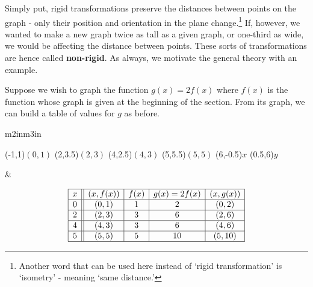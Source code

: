 \smallskip

Simply put, rigid transformations preserve the distances between points on the graph -  only their position and orientation in the plane change.\footnote{Another word that can be used here instead of `rigid transformation' is `isometry' - meaning `same distance.'}  If, however, we wanted to make a new graph twice as tall as a given graph, or one-third as wide, we would be affecting the distance between points. These sorts of transformations are hence called \textbf{non-rigid}.  As always, we motivate the general theory with an example.

\smallskip

Suppose we wish to graph the function $g(x) =2 f(x)$ where $f(x)$ is the function whose graph is given at the beginning of the section. From its graph, we can build a table of values for $g$ as before.

\begin{center}

\begin{tabular}{m{2in}m{3in}}

\begin{mfpic}[15]{-1}{6}{-1}{6}
\tlabel[cc](-1,1){\scriptsize $(0,1)$}
\tlabel[cc](2,3.5){\scriptsize $(2,3)$}
\tlabel[cc](4,2.5){\scriptsize $(4,3)$}
\tlabel[cc](5,5.5){\scriptsize $(5,5)$}
\tlabel[cc](6,-0.5){\scriptsize $x$}
\tlabel[cc](0.5,6){\scriptsize $y$}
\axes
{}
\tlpointsep{4pt}
\penwd{1.25pt}
\end{mfpic}
 
&

\[ \begin{array}{|c||c|c|c|c|}  

\hline

 x & (x,f(x)) & f(x) & g(x)=2f(x) & (x, g(x)) \\ \hline
0  & (0,1)& 1 & 2 &(0, 2) \\  \hline
2 & (2,3) & 3 &  6 &(2,6) \\  \hline
4 & (4,3) & 3 &  6 &(4, 6) \\  \hline
5 & (5,5) & 5 &  10 &( 5 ,10) \\  \hline

\end{array} \] 

\end{tabular}

\end{center}

